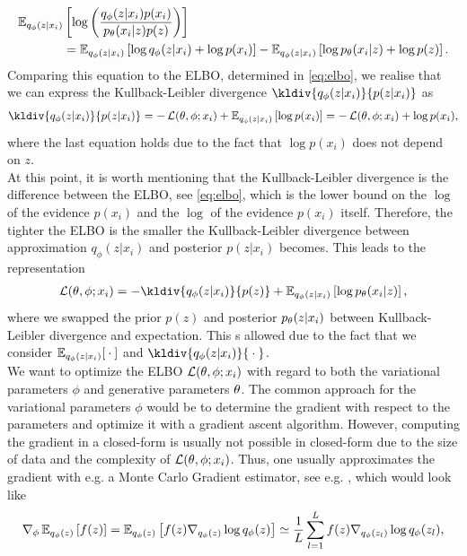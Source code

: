 \begin{align*}
\operatorname{\mathbb{E}}_{q_{\phi}(z|x_i)} &\left[ \log \left( \frac{q_{\phi}(z|x_i)p(x_i)}{p_{\theta}(x_i| z)p(z)} \right) \right]\\
&= \operatorname{\mathbb{E}}_{q_{\phi}(z|x_i)} \left[ \log q_{\phi}(z|x_i) + \log p(x_i)  \right] - \operatorname{\mathbb{E}}_{q_{\phi}(z|x_i)} \left[ \log p_{\theta}(x_i| z) + \log p(z)\right].
\end{align*}
Comparing this equation to the ELBO, determined in \eqref{eq:elbo}, we realise that we can express the Kullback-Leibler divergence $\kldiv{q_{\phi}(z|x_i)}{p(z|x_i)}$ as
\begin{align*}
\kldiv{q_{\phi}(z|x_i)}{p(z|x_i)} = - \loss(\t, \phi; x_i) + \E_{q_{\phi}(z|x_i)} \left[ \log p(x_i) \right] = - \loss(\t, \phi; x_i) + \log p(x_i),
\end{align*}
where the last equation holds due to the fact that $\log p(x_i)$ does not depend on $z$.\\
At this point, it is worth mentioning that the Kullback-Leibler divergence is the difference between the ELBO, see \eqref{eq:elbo}, which is the lower bound on the $\log$ of the evidence $p(x_i)$ and the $\log$ of the evidence $p(x_i)$ itself. Therefore, the tighter the ELBO is the smaller the Kullback-Leibler divergence between approximation $q_{\phi}(z|x_i)$ and posterior $p(z|x_i)$ becomes. This leads to the representation
\begin{align}\label{eq:alternative_loss}
\loss(\t,\phi ; x_i) = - \kldiv{q_{\phi}(z|x_i)}{p(z)} + \E_{q_{\phi}(z|x_i)} \left[ \log p_{\t}(x_i|z) \right],
\end{align}
where we swapped the prior $p(z)$ and posterior $p_{\theta}(z|x_i)$ between Kullback-Leibler divergence and expectation. This s allowed due to the fact that we consider $\operatorname{\mathbb{E}}_{q_{\phi}(z|x_i)}[{}\cdot{}]$ and $\kldiv{q_{\phi}(z|x_i)}{\wc}$.\\
We want to optimize the ELBO $\operatorname{\mathcal{L}}(\theta,\phi ; x_i)$ with regard to both the variational parameters $\phi$ and generative parameters $\theta$. The common approach for the variational parameters $\phi$ would be to determine the gradient with respect to the parameters and optimize it with a gradient ascent algorithm. However, computing the gradient in a closed-form is usually not possible in closed-form due to the size of data and the complexity of $\operatorname{\mathcal{L}}(\theta,\phi ; x_i) $. Thus, one usually approximates the gradient with e.g. a Monte Carlo Gradient estimator, see e.g. \cite[Section~11.1.6]{bishop2006pattern}, which would look like
\begin{align*}
\nabla_{\phi} \operatorname{\mathbb{E}}_{q_{\phi}(z)} \left[ f(z) \right] = \operatorname{\mathbb{E}}_{q_{\phi}(z)} \left[ f(z) \nabla_{q_{\phi}(z)}\log q_{\phi} (z)\right] \simeq \frac{1}{L} \sum_{l=1}^L f(z) \nabla_{q_{\phi}(z_l)}\log q_{\phi} (z_l),
\end{align*}
